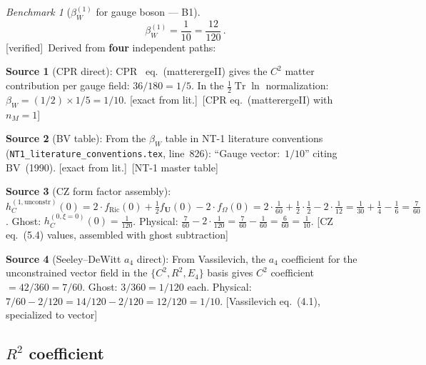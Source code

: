 \documentclass[12pt,a4paper]{article}
\theoremstyle{definition}
\theoremstyle{remark}
\newtheorem{benchmark}[proposition]{Benchmark}
\newcommand{\Tr}{\operatorname{Tr}}
\newcommand{\fromlit}[1]{\textcolor{blue!70!black}{\textsf{[#1]}}}
\newcommand{\exactlit}{\textcolor{blue!60!black}{\textsf{[exact from lit.]}}}
\newcommand{\verified}{\textcolor{green!50!black}{\textsf{[verified]}}}
\begin{document}
\begin{benchmark}[$\beta_W^{(1)}$ for gauge boson --- B1]
\label{bench:beta-W}
\begin{equation}
  \boxed{
  \beta_W^{(1)} = \frac{1}{10} = \frac{12}{120}\,.
  }
  \label{eq:beta-W-vector}
\end{equation}
\verified\ Derived from \textbf{four} independent paths:

\medskip\noindent
\textbf{Source 1} (CPR direct):
CPR~\cite{CPR2009} eq.~(matterergeII) gives the $C^2$ matter
contribution per gauge field: $36/180 = 1/5$.
In the $\frac{1}{2}\Tr\ln$ normalization:
$\beta_W = (1/2) \times 1/5 = 1/10$.
\exactlit\ \fromlit{CPR eq.~(matterergeII) with $n_M = 1$}

\medskip\noindent
\textbf{Source 2} (BV table):
From the $\beta_W$ table in NT-1 literature conventions
(\texttt{NT1\_literature\_conventions.tex}, line~826):
``Gauge vector:~$1/10$'' citing BV~(1990). \exactlit\ \fromlit{NT-1 master table}

\medskip\noindent
\textbf{Source 3} (CZ form factor assembly):
$h_C^{(1,\mathrm{unconstr})}(0) = 2\cdot f_{\mathrm{Ric}}(0)
+ \frac{1}{2}f_{\mathbf{U}}(0) - 2\cdot f_\Omega(0)
= 2\cdot\frac{1}{60} + \frac{1}{2}\cdot\frac{1}{2}
- 2\cdot\frac{1}{12}
= \frac{1}{30} + \frac{1}{4} - \frac{1}{6}
= \frac{7}{60}$.
Ghost: $h_C^{(0,\xi=0)}(0) = \frac{1}{120}$.
Physical: $\frac{7}{60} - 2\cdot\frac{1}{120}
= \frac{7}{60} - \frac{1}{60} = \frac{6}{60} = \frac{1}{10}$.
\fromlit{CZ eq.~(5.4) values, assembled with ghost subtraction}

\medskip\noindent
\textbf{Source 4} (Seeley--DeWitt $a_4$ direct):
From Vassilevich, the $a_4$ coefficient for the unconstrained
vector field in the $\{C^2, R^2, E_4\}$ basis gives
$C^2$ coefficient $= 42/360 = 7/60$.
Ghost: $3/360 = 1/120$ each.
Physical: $7/60 - 2/120 = 14/120 - 2/120 = 12/120 = 1/10$.
\fromlit{Vassilevich eq.~(4.1), specialized to vector}
\end{benchmark}


\subsection{$R^2$ coefficient}
\end{document}
